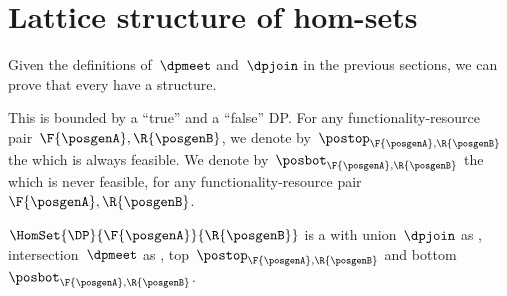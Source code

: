 \section{Lattice structure of \DP hom-sets}

Given the definitions of~$\dpmeet$ and~$\dpjoin$ in the previous sections, we can prove that every \DP {} have a  structure.

This  is bounded by a ``true'' and a ``false'' DP.
For any functionality-resource pair~$\F{\posgenA},\R{\posgenB}$, we denote by~$\postop_{\F{\posgenA},\R{\posgenB}}$ the  which is always feasible.
We denote by~$\posbot_{\F{\posgenA},\R{\posgenB}}$ the  which is never feasible, for any functionality-resource pair~$\F{\posgenA},\R{\posgenB}$.
\begin{lemma}
    \label{lem:dpboundedlattice}
    $\HomSet{\DP}{\F{\posgenA}}{\R{\posgenB}}$ is a  with union~$\dpjoin$ as , intersection~$\dpmeet$ as , top~$\postop_{\F{\posgenA},\R{\posgenB}}$ and bottom~$\posbot_{\F{\posgenA},\R{\posgenB}}$.
\end{lemma}

